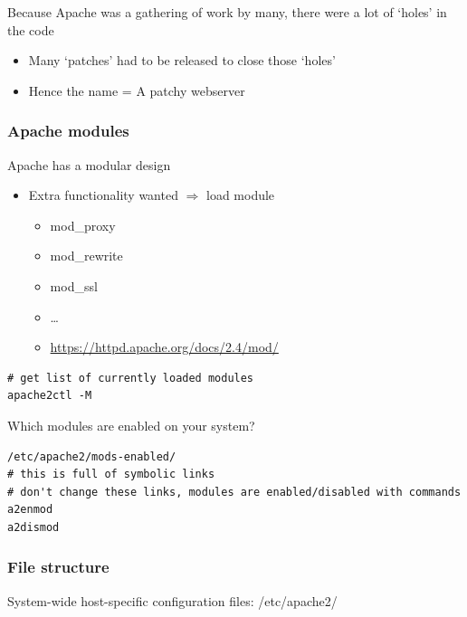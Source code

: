 \documentclass{article}
\begin{document}
Because Apache was a gathering of work by many, there were a lot of `holes' in the code

\begin{itemize}
    \item Many `patches' had to be released to close those `holes'
    \item Hence the name = A patchy webserver
\end{itemize}

\subsubsection{Apache modules}

Apache has a modular design

\begin{itemize}
    \item Extra functionality wanted $\Rightarrow$ load module
    \begin{itemize}
        \item mod\_proxy
        \item mod\_rewrite
        \item mod\_ssl
        \item \dots
        \item \url{https://httpd.apache.org/docs/2.4/mod/}
    \end{itemize}
\end{itemize}

\begin{verbatim}
# get list of currently loaded modules
apache2ctl -M
\end{verbatim}

Which modules are enabled on your system?

\begin{verbatim}
/etc/apache2/mods-enabled/
# this is full of symbolic links
# don't change these links, modules are enabled/disabled with commands
a2enmod
a2dismod
\end{verbatim}

\subsubsection{File structure}

System-wide host-specific configuration files: /etc/apache2/
\end{document}
